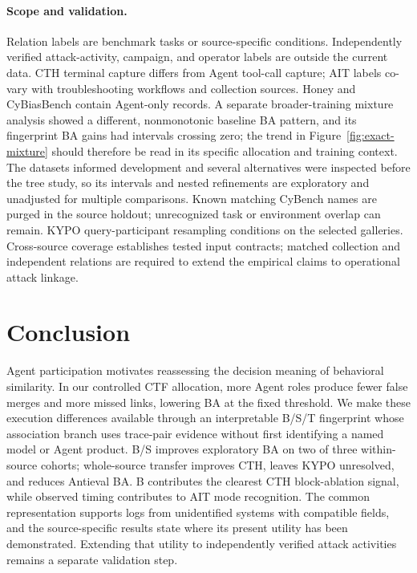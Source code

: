 \documentclass[10pt]{article}
\begin{document}
\paragraph{Scope and validation.} Relation labels are benchmark tasks or source-specific conditions. Independently verified attack-activity, campaign, and operator labels are outside the current data. CTH terminal capture differs from Agent tool-call capture; AIT labels co-vary with troubleshooting workflows and collection sources. Honey and CyBiasBench contain Agent-only records. A separate broader-training mixture analysis showed a different, nonmonotonic baseline BA pattern, and its fingerprint BA gains had intervals crossing zero; the trend in Figure~\ref{fig:exact-mixture} should therefore be read in its specific allocation and training context. The datasets informed development and several alternatives were inspected before the tree study, so its intervals and nested refinements are exploratory and unadjusted for multiple comparisons. Known matching CyBench names are purged in the source holdout; unrecognized task or environment overlap can remain. KYPO query-participant resampling conditions on the selected galleries. Cross-source coverage establishes tested input contracts; matched collection and independent relations are required to extend the empirical claims to operational attack linkage.

\section{Conclusion}
Agent participation motivates reassessing the decision meaning of behavioral similarity. In our controlled CTF allocation, more Agent roles produce fewer false merges and more missed links, lowering BA at the fixed threshold. We make these execution differences available through an interpretable B/S/T fingerprint whose association branch uses trace-pair evidence without first identifying a named model or Agent product. B/S improves exploratory BA on two of three within-source cohorts; whole-source transfer improves CTH, leaves KYPO unresolved, and reduces Antieval BA. B contributes the clearest CTH block-ablation signal, while observed timing contributes to AIT mode recognition. The common representation supports logs from unidentified systems with compatible fields, and the source-specific results state where its present utility has been demonstrated. Extending that utility to independently verified attack activities remains a separate validation step.
\end{document}
